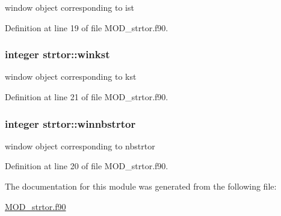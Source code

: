 window object corresponding to ist 



Definition at line 19 of file M\-O\-D\-\_\-strtor.\-f90.

\hypertarget{classstrtor_ad66d27416264d8558cdbbc9d9e5cc199}{
\subsubsection[{winkst}]{\setlength{\rightskip}{0pt plus 5cm}integer strtor\-::winkst}}\label{classstrtor_ad66d27416264d8558cdbbc9d9e5cc199}


window object corresponding to kst 



Definition at line 21 of file M\-O\-D\-\_\-strtor.\-f90.

\hypertarget{classstrtor_a3c7d3de6901768d3931371425c04b1e6}{
\subsubsection[{winnbstrtor}]{\setlength{\rightskip}{0pt plus 5cm}integer strtor\-::winnbstrtor}}\label{classstrtor_a3c7d3de6901768d3931371425c04b1e6}


window object corresponding to nbstrtor 



Definition at line 20 of file M\-O\-D\-\_\-strtor.\-f90.



The documentation for this module was generated from the following file\-:\begin{DoxyCompactItemize}
\item 
\hyperlink{MOD__strtor_8f90}{M\-O\-D\-\_\-strtor.\-f90}\end{DoxyCompactItemize}
